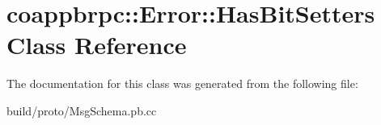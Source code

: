 \hypertarget{classcoappbrpc_1_1Error_1_1HasBitSetters}{}\section{coappbrpc\+:\+:Error\+:\+:Has\+Bit\+Setters Class Reference}
\label{classcoappbrpc_1_1Error_1_1HasBitSetters}


The documentation for this class was generated from the following file\+:\begin{DoxyCompactItemize}
\item 
build/proto/Msg\+Schema.\+pb.\+cc\end{DoxyCompactItemize}
